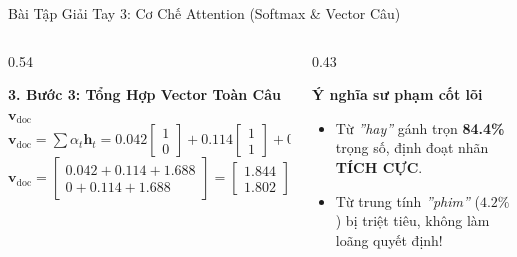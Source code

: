 \documentclass[aspectratio=169, 10pt]{beamer}
\begin{document}
\begin{frame}{Bài Tập Giải Tay 3: Cơ Chế Attention (Softmax \& Vector Câu)}
  \vspace{0.12cm}
  \begin{columns}[T, onlytextwidth]
    \begin{column}{0.54\textwidth}
      \begin{block}{\small\textbf{3. Bước 3: Tổng Hợp Vector Toàn Câu $\mathbf{v}_{\text{doc}}$}}
        \fontsize{7.5}{9.5}\selectfont
        $\mathbf{v}_{\text{doc}} = \sum \alpha_t \mathbf{h}_t = 0.042\begin{bmatrix}1\\0\end{bmatrix} + 0.114\begin{bmatrix}1\\1\end{bmatrix} + 0.844\begin{bmatrix}2\\2\end{bmatrix}$
        $$\mathbf{v}_{\text{doc}} = \begin{bmatrix} 0.042 + 0.114 + 1.688 \\ 0 + 0.114 + 1.688 \end{bmatrix} = \begin{bmatrix} \mathbf{1.844} \\ \mathbf{1.802} \end{bmatrix}$$
      \end{block}
    \end{column}
    \hfill
    \begin{column}{0.43\textwidth}
      \begin{alertblock}{\small\textbf{Ý nghĩa sư phạm cốt lõi}}
        \fontsize{7.5}{9.5}\selectfont
        \begin{itemize}\setlength{\itemsep}{0.12em}
          \item Từ \textit{''hay''} gánh trọn \textbf{84.4\%} trọng số, định đoạt nhãn \textbf{\color{HCMUEGreen}TÍCH CỰC}.
          \item Từ trung tính \textit{''phim''} ($4.2\%$) bị triệt tiêu, không làm loãng quyết định!
        \end{itemize}
      \end{alertblock}
    \end{column}
  \end{columns}
\end{frame}
\end{document}
